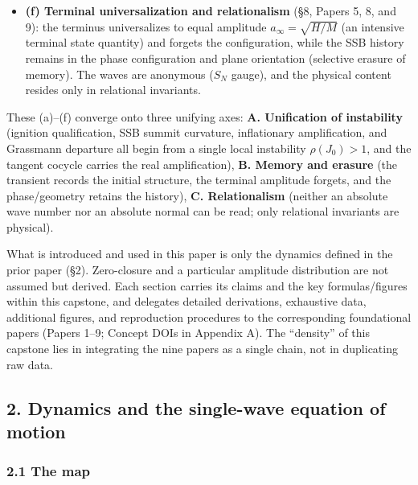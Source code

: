 \documentclass[
  a4paper,
]{ltjsarticle}
\begin{document}
\begin{itemize}
  \textbf{(e) Geometry------exponential departure on the Grassmann} (§7,
  Paper 7): the state is a rank-2 plane \(P(t)\) at each instant
  (\(\Pi_{t+1}=Q_t\Pi_tQ_t^{\mathsf T}\)), and since
  \(H_\perp/H=\tfrac14\|\Pi_t-\Pi_0\|_F^2\), inflation is exponential
  departure from the initial plane on \(\mathrm{Gr}(2,M)\); the terminal
  plane spans four dimensions with two nonzero principal angles (the
  cumulative map is not \(SO(4)\)).
\item
  \textbf{(f) Terminal universalization and relationalism} (§8, Papers
  5, 8, and 9): the terminus universalizes to equal amplitude
  \(a_\infty=\sqrt{H/M}\) (an intensive terminal state quantity) and
  forgets the configuration, while the SSB history remains in the phase
  configuration and plane orientation (selective erasure of memory). The
  waves are anonymous (\(S_N\) gauge), and the physical content resides
  only in relational invariants.
\end{itemize}

These (a)--(f) converge onto three unifying axes: \textbf{A. Unification
of instability} (ignition qualification, SSB summit curvature,
inflationary amplification, and Grassmann departure all begin from a
single local instability \(\rho(J_0)>1\), and the tangent cocycle
carries the real amplification), \textbf{B. Memory and erasure} (the
transient records the initial structure, the terminal amplitude forgets,
and the phase/geometry retains the history), \textbf{C. Relationalism}
(neither an absolute wave number nor an absolute normal can be read;
only relational invariants are physical).

What is introduced and used in this paper is only the dynamics defined
in the prior paper (§2). Zero-closure and a particular amplitude
distribution are not assumed but derived. Each section carries its
claims and the key formulas/figures within this capstone, and delegates
detailed derivations, exhaustive data, additional figures, and
reproduction procedures to the corresponding foundational papers (Papers
1--9; Concept DOIs in Appendix A). The ``density'' of this capstone lies
in integrating the nine papers as a single chain, not in duplicating raw
data.

\subsection{2. Dynamics and the single-wave equation of
motion}\label{dynamics-and-the-single-wave-equation-of-motion}

\subsubsection{2.1 The map}\label{the-map}
\end{document}
